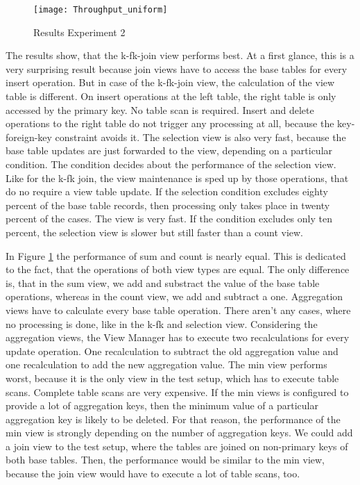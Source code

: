 \documentclass[11pt,a4paper,bibtotoc,idxtotoc,headsepline,footsepline,footexclude,BCOR12mm,DIV13]{scrbook}
\begin{document}
\begin{figure}[h!]
  
  \centering
    \texttt{[image: Throughput\_uniform]}
    \caption{Results Experiment 2}
    \label{fig:throughput_uniform}
\end{figure}

The results show, that the k-fk-join view performs best. At a first glance, this is a very surprising result because join views have to access the base tables for every insert operation. But in case of the k-fk-join view, the calculation of the view table is different. On insert operations at the left table, the right table is only accessed by the primary key. No table scan is required. Insert and delete operations to the right table do not trigger any processing at all, because the key-foreign-key constraint avoids it. The selection view is also very fast, because the base table updates are just forwarded to the view, depending on a particular condition. The condition decides about the performance of the selection view. Like for the k-fk join, the view maintenance is sped up by those operations, that do no require a view table update. If the selection condition excludes eighty percent of the base table records, then processing only takes place in twenty percent of the cases. The view is very fast. If the condition excludes only ten percent, the selection view is slower but still faster than a count view.

 In Figure \ref{fig:throughput_uniform} the performance of sum and count is nearly equal. This is dedicated to the fact, that the operations of both view types are equal. The only difference is, that in the sum view, we add and substract the value of the base table operations, whereas in the count view, we add and subtract a one. Aggregation views have to calculate every base table operation. There aren't any cases, where no processing is done, like in the k-fk and selection view. Considering the aggregation views, the View Manager has to execute two recalculations for every update operation. One recalculation to subtract the old aggregation value and one recalculation to add the new aggregation value. The min view performs worst, because it is the only view in the test setup, which has to execute table scans. Complete table scans are very expensive. If the min views is configured to provide a lot of aggregation keys, then the minimum value of a particular aggregation key is likely to be deleted. For that reason, the performance of the min view is strongly depending on the number of aggregation keys. We could add a join view to the test setup, where the tables are joined on non-primary keys of both base tables. Then, the performance would be similar to the min view, because the join view would have to execute a lot of table scans, too.
\end{document}
